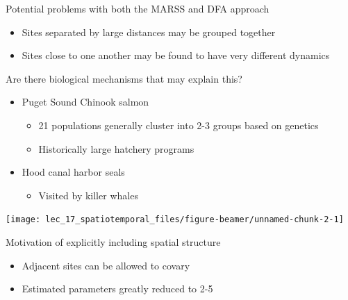 \documentclass[
  ignorenonframetext,
]{beamer}
\providecommand{\tightlist}{%
  \setlength{\itemsep}{0pt}\setlength{\parskip}{0pt}}
\begin{document}
\begin{frame}{Potential problems with both the MARSS and DFA approach}
\protect\hypertarget{potential-problems-with-both-the-marss-and-dfa-approach}{}

\begin{itemize}
\item
  Sites separated by large distances may be grouped together
\item
  Sites close to one another may be found to have very different
  dynamics
\end{itemize}

\end{frame}

\begin{frame}{Are there biological mechanisms that may explain this?}
\protect\hypertarget{are-there-biological-mechanisms-that-may-explain-this}{}

\begin{itemize}
\tightlist
\item
  Puget Sound Chinook salmon

  \begin{itemize}
  \tightlist
  \item
    21 populations generally cluster into 2-3 groups based on genetics
  \item
    Historically large hatchery programs
  \end{itemize}
\item
  Hood canal harbor seals

  \begin{itemize}
  \tightlist
  \item
    Visited by killer whales
  \end{itemize}
\end{itemize}

\begin{center}\texttt{[image: lec\_17\_spatiotemporal\_files/figure-beamer/unnamed-chunk-2-1]} \end{center}

\end{frame}

\begin{frame}{Motivation of explicitly including spatial structure}
\protect\hypertarget{motivation-of-explicitly-including-spatial-structure}{}

\begin{itemize}
\item
  Adjacent sites can be allowed to covary
\item
  Estimated parameters greatly reduced to 2-5
\end{itemize}

\end{frame}
\end{document}
